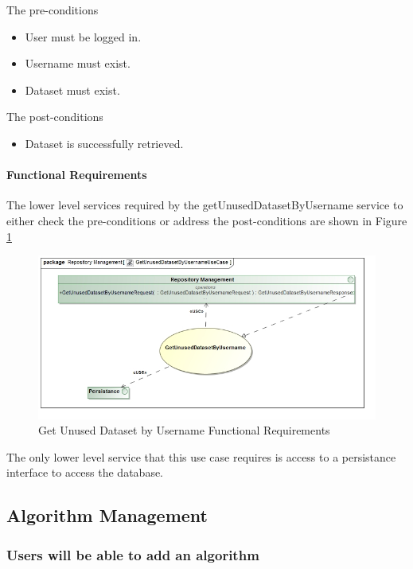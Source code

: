 The pre-conditions
\begin{itemize}
	\item User must be logged in.
	\item Username must exist.
	\item Dataset must exist.
\end{itemize}

The post-conditions
\begin{itemize}
	\item Dataset is successfully retrieved.
\end{itemize}

\paragraph{Functional Requirements}
The lower level services required by the getUnusedDatasetByUsername service to either check the
pre-conditions or address the post-conditions are shown in Figure \ref{fig:getUnusedDatasetByUsernameUseCase}
\begin{figure}[H]
	\begin{center}
		\includegraphics[scale=0.6]{../Diagrams and Charts/Test Data/GetUnusedDatasetByUsernameUseCase.jpg}
		\caption{Get Unused Dataset by Username Functional Requirements}
		\label{fig:getUnusedDatasetByUsernameUseCase}
	\end{center}
\end{figure}

The only lower level service that this use case requires is access to
a persistance interface to access the database.

\subsection{Algorithm Management}
\subsubsection {Users will be able to add an algorithm}
